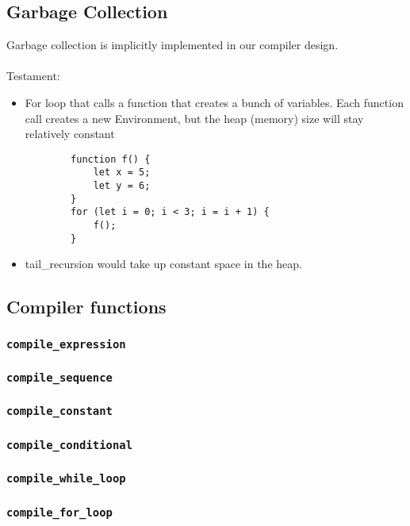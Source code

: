 \subsection{Garbage Collection}

Garbage collection is implicitly implemented in our compiler design.\\\\
Testament:
\begin{itemize}
	\item For loop that calls a function that creates a bunch of variables. Each function call creates a new Environment, but the heap (memory) size will stay relatively constant
	\begin{verbatim}
		function f() {
		    let x = 5;
		    let y = 6;
		}
		for (let i = 0; i < 3; i = i + 1) {
		    f();
		}
	\end{verbatim}
	\item tail\_recursion would take up constant space in the heap.
\end{itemize}

\subsection{Compiler functions}
\subsubsection{\texttt{compile\_expression}}

\subsubsection{\texttt{compile\_sequence}}

\subsubsection{\texttt{compile\_constant}}

\subsubsection{\texttt{compile\_conditional}}

\subsubsection{\texttt{compile\_while\_loop}}

\subsubsection{\texttt{compile\_for\_loop}}

